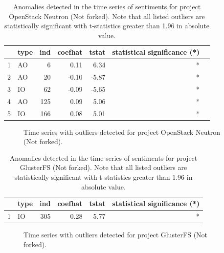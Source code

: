 \documentclass[12pt,letterpaper]{gthesis2}  %
\begin{document}
\pagebreak

\begin{table} [!htbp]
\centering
\caption{Anomalies detected in the time series of sentiments for project OpenStack Neutron (Not forked). Note that all listed outliers are statistically significant with t-statistics greater than 1.96 in absolute value.}
\begin{tabular}{rlrrrrr}
  \hline
 & type & ind & coefhat & tstat & statistical significance (*) \\ 
  \hline
1 & AO &   6 & 0.11 & 6.34 & * \\ 
  2 & AO &  20 & -0.10 & -5.87  & *  \\ 
  3 & IO &  62 & -0.09 & -5.65  & * \\ 
  4 & AO & 125 & 0.09 & 5.06  & * \\ 
  5 & IO & 166 & 0.08 & 5.01  & * \\ 
   \hline
\end{tabular}
\end{table}


\begin{figure}[!htbp]
\centering
{}
\caption{Time series with outliers detected for project OpenStack Neutron (Not forked).}
\label{figureOutliers_11}
\end{figure}

\pagebreak


\begin{table} [!htbp]
\centering
\caption{Anomalies detected in the time series of sentiments for project GlusterFS (Not forked). Note that all listed outliers are statistically significant with t-statistics greater than 1.96 in absolute value.}
\begin{tabular}{rlrrrr}
  \hline
 & type & ind & coefhat & tstat & statistical significance (*) \\ 
  \hline
1 & IO & 305 & 0.28 & 5.77  & *\\ 
   \hline
\end{tabular}
\end{table}

\begin{figure} [!htbp]
\centering
{}
\caption{Time series with outliers detected for project GlusterFS (Not forked).}
\label{figureOutliers_12}
\end{figure}


%
\end{document}
